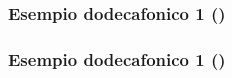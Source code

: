 \begin{frame}
    \frametitle{Esempio dodecafonico 1 ()}

    \begin{center}
    \end{center}

\end{frame}

\begin{frame}
    \frametitle{Esempio dodecafonico 1 ()}

    \begin{center}
    \end{center}

\end{frame}
